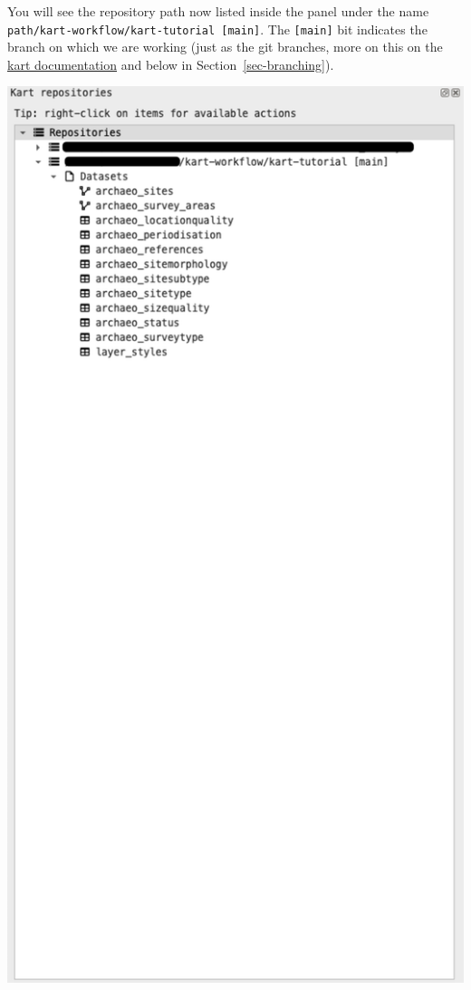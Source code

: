 \documentclass[
  letterpaper,
  DIV=11,
  numbers=noendperiod]{scrartcl}
\begin{document}
You will see the repository path now listed inside the panel under the
name \texttt{path/kart-workflow/kart-tutorial\ {[}main{]}}. The
\texttt{{[}main{]}} bit indicates the branch on which we are working
(just as the git branches, more on this on the
\href{https://docs.kartproject.org/en/latest/pages/quick_guide.html\#branching}{kart
documentation} and below in Section~\ref{sec-branching}).

\begin{center}
\includegraphics{img/kart-panel-expand.png}
\end{center}
\end{document}
